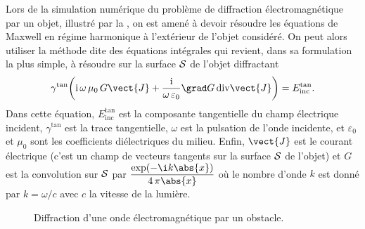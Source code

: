 Lors de la simulation numérique du problème de diffraction électromagnétique par un objet, illustré par la , on est amené à devoir résoudre les équations de Maxwell en régime harmonique à l'extérieur de l'objet considéré. On peut alors utiliser la méthode dite des équations intégrales qui revient, dans sa formulation la plus simple, à résoudre sur la surface $\mathcal{S}$ de l'objet diffractant
\begin{equation} \label{eq:efie}
\gamma^\mathrm{tan} \mathopen{}\left( \mathrm{i} \, \omega \, \mu_0 \, G \vect{J} + \frac{\mathrm{i}}{\omega \, \varepsilon_0} \grad G \, \mathrm{div} \vect{J} \right) = E^\mathrm{tan}_\mathrm{inc}.
\end{equation}
Dans cette équation, $E^\mathrm{tan}_\mathrm{inc}$ est la composante tangentielle du champ électrique incident, $\gamma^\mathrm{tan}$ est la trace tangentielle, $\omega$ est la pulsation de l'onde incidente, et $\varepsilon_0$ et $\mu_0$ sont les coefficients diélectriques du milieu. Enfin, $\vect{J}$ est le courant électrique (c'est un champ de vecteurs tangents sur la surface $\mathcal{S}$ de l'objet) et $G$ est la convolution sur $\mathcal{S}$ par $\displaystyle\frac{\exp(-\i k \abs{x})}{4 \, \pi \abs{x}}$ où le nombre d'onde $k$ est donné par $k = \omega / c$ avec $c$ la vitesse de la lumière. 

\begin{figure}[H]
    \centering
    
    \caption{Diffraction d'une onde électromagnétique par un obstacle.}
    \label{fig:diffraction}
\end{figure}

